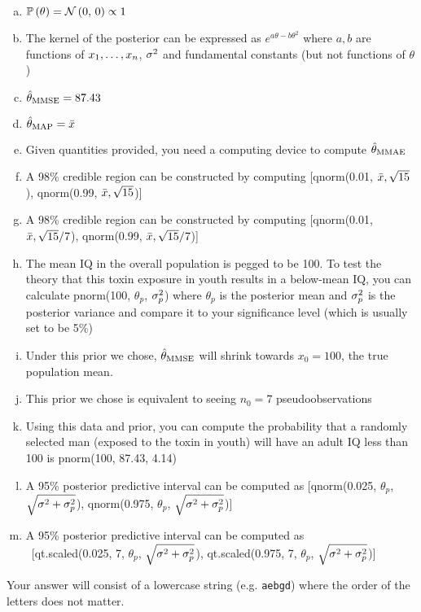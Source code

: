 \documentclass[12pt,landscape]{article}
\newcommand{\instr}{\small Your answer will consist of a lowercase string (e.g. \texttt{aebgd}) where the order of the letters does not matter. \normalsize}
\begin{document}

\vspace{-0.2cm}\benum{} 

\begin{enumerate}[(a)]
\item $\mathbb{P}\left(\theta\right) = \mathcal{N}\left(0,\,0\right) \propto 1$
\item The kernel of the posterior can be expressed as $e^{a\theta - b\theta^2}$ where $a,b$ are functions of $x_1, \ldots, x_n$, $\sigma^2$ and fundamental constants (but not functions of $\theta$)
\item $\hat{\theta}_{\mathrm{MMSE}} = 87.43$
\item $\hat{\theta}_{\mathrm{MAP}} = \bar{x}$
\item Given quantities provided, you need a computing device to compute $\hat{\theta}_{\mathrm{MMAE}}$
\item A 98\% credible region can be constructed by computing [qnorm(0.01, $\bar{x}, \sqrt{15}$), qnorm(0.99, $\bar{x}, \sqrt{15}$)]
\item A 98\% credible region can be constructed by computing [qnorm(0.01, $\bar{x}, \sqrt{15} / 7$), qnorm(0.99, $\bar{x}, \sqrt{15} / 7$)]
\item The mean IQ in the overall population is pegged to be 100. To test the theory that this toxin exposure in youth results in a below-mean IQ, you can calculate pnorm(100, $\theta_p$, $\sigma^2_p$) where $\theta_p$ is the posterior mean and $\sigma^2_p$ is the posterior variance and compare it to your significance level (which is usually set to be 5\%)
\item Under this prior we chose, $\hat{\theta}_{\mathrm{MMSE}}$ will shrink towards $x_0 = 100$, the true population mean.
\item This prior we chose is equivalent to seeing $n_0 = 7$ pseudoobservations
\item Using this data and prior, you can compute the probability that a randomly selected man (exposed to the toxin in youth) will have an adult IQ less than 100 is pnorm(100, 87.43, 4.14)
\item A 95\% posterior predictive interval can be computed as [qnorm(0.025, $\theta_p$, $\sqrt{\sigma^2 + \sigma^2_p}$), qnorm(0.975, $\theta_p$, $\sqrt{\sigma^2 + \sigma^2_p}$)]
\item A 95\% posterior predictive interval can be computed as \\ ~[qt.scaled(0.025, 7, $\theta_p$, $\sqrt{\sigma^2 + \sigma^2_p}$), qt.scaled(0.975, 7, $\theta_p$, $\sqrt{\sigma^2 + \sigma^2_p}$)]
\end{enumerate}
\eenum\instr\pagebreak
\end{document}
